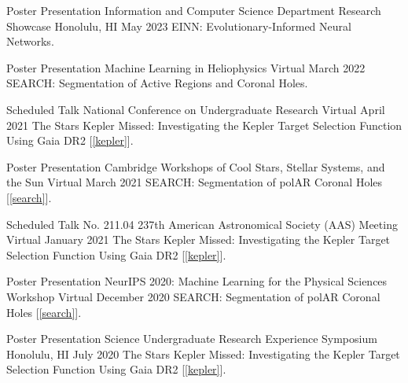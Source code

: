 \begin{cventries}
\vspace{0mm}

\cventry
{Poster Presentation}
{Information and Computer Science Department Research Showcase}
{Honolulu, HI}
{May 2023}
{
    EINN: Evolutionary-Informed Neural Networks.
}

\vspace{0mm}

\cventry
{Poster Presentation}
{Machine Learning in Heliophysics}
{Virtual}
{March 2022}
{
    SEARCH: Segmentation of Active Regions and Coronal Holes.
}

\vspace{0mm}

\cventry
{Scheduled Talk}
{National Conference on Undergraduate Research}
{Virtual}
{April 2021}
{
    The Stars Kepler Missed: Investigating the Kepler Target Selection Function Using Gaia DR2 [\ref{kepler}].
}

\vspace{0mm}

\cventry
{Poster Presentation}
{Cambridge Workshops of Cool Stars, Stellar Systems, and the Sun}
{Virtual}
{March 2021}
{
    SEARCH: Segmentation of polAR Coronal Holes [\ref{search}].
}

\vspace{0mm}

\cventry
{Scheduled Talk No. 211.04}
{237th American Astronomical Society (AAS) Meeting}
{Virtual}
{January 2021}
{
    The Stars Kepler Missed: Investigating the Kepler Target Selection Function Using Gaia DR2 [\ref{kepler}].
}

\vspace{0mm}

\cventry
{Poster Presentation}
{NeurIPS 2020: Machine Learning for the Physical Sciences Workshop}
{Virtual}
{December 2020}
{
    SEARCH: Segmentation of polAR Coronal Holes [\ref{search}].
}

\vspace{0mm}

\cventry
{Poster Presentation}
{Science Undergraduate Research Experience Symposium}
{Honolulu, HI}
{July 2020}
{
    The Stars Kepler Missed: Investigating the Kepler Target Selection Function Using Gaia DR2 [\ref{kepler}].
}

\vspace{-2mm}

\end{cventries}
